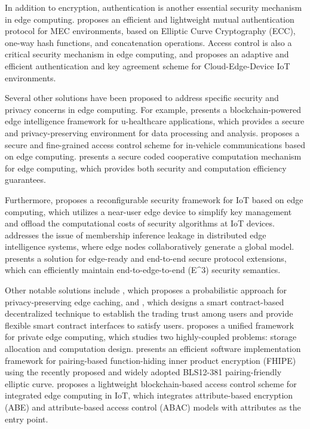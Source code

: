 \documentclass[11pt]{article}
\begin{document}
In addition to encryption, authentication is another essential security mechanism in edge computing. \cite{ref95} proposes an efficient and lightweight mutual authentication protocol for MEC environments, based on Elliptic Curve Cryptography (ECC), one-way hash functions, and concatenation operations. Access control is also a critical security mechanism in edge computing, and \cite{ref96} proposes an adaptive and efficient authentication and key agreement scheme for Cloud-Edge-Device IoT environments.

Several other solutions have been proposed to address specific security and privacy concerns in edge computing. For example, \cite{ref97} presents a blockchain-powered edge intelligence framework for u-healthcare applications, which provides a secure and privacy-preserving environment for data processing and analysis. \cite{ref98} proposes a secure and fine-grained access control scheme for in-vehicle communications based on edge computing. \cite{ref99} presents a secure coded cooperative computation mechanism for edge computing, which provides both security and computation efficiency guarantees.

Furthermore, \cite{ref100} proposes a reconfigurable security framework for IoT based on edge computing, which utilizes a near-user edge device to simplify key management and offload the computational costs of security algorithms at IoT devices. \cite{ref90} addresses the issue of membership inference leakage in distributed edge intelligence systems, where edge nodes collaboratively generate a global model. \cite{ref101} presents a solution for edge-ready and end-to-end secure protocol extensions, which can efficiently maintain end-to-edge-to-end (E\^{}3) security semantics.

Other notable solutions include \cite{ref102}, which proposes a probabilistic approach for privacy-preserving edge caching, and \cite{ref103}, which designs a smart contract-based decentralized technique to establish the trading trust among users and provide flexible smart contract interfaces to satisfy users. \cite{ref104} proposes a unified framework for private edge computing, which studies two highly-coupled problems: storage allocation and computation design. \cite{ref105} presents an efficient software implementation framework for pairing-based function-hiding inner product encryption (FHIPE) using the recently proposed and widely adopted BLS12-381 pairing-friendly elliptic curve. \cite{ref106} proposes a lightweight blockchain-based access control scheme for integrated edge computing in IoT, which integrates attribute-based encryption (ABE) and attribute-based access control (ABAC) models with attributes as the entry point.
\end{document}
